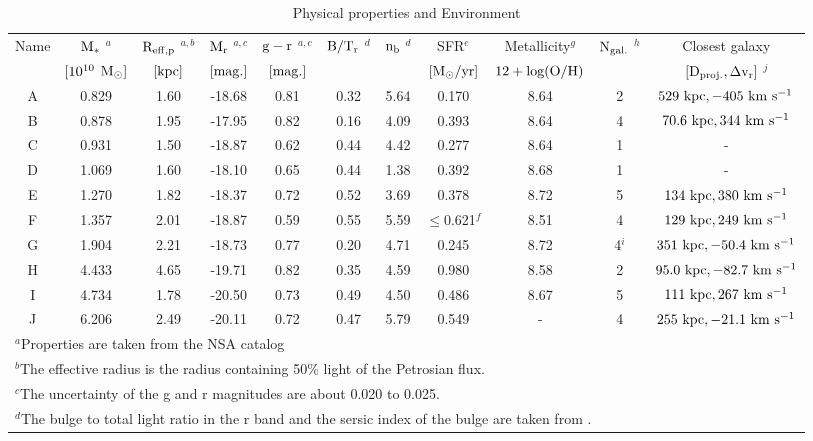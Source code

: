 \documentclass[fleqn,usenatbib]{mnras}
\begin{document}
\begin{table}
\centering
\caption{Physical properties and Environment}
\label{tab:photometric}
\begin{tabular}{ccccccccccc}

\hline
Name & $\rm M_{*}$ $^{a}$ & $\rm R_{eff,p}$ $^{a,b}$ &
$\rm M_{r}$ $^{a,c}$ & $\rm g-r$ $^{a,c}$ & $\rm B/T_{r}$ $^{d}$ & $\rm n_{b}$ $^{d}$ & 
SFR$^{e}$ & Metallicity$^{g}$ & 
$\rm N_{gal.}$ $^{h}$ & Closest galaxy\\
 & $\rm [10^{10}$ $\rm M_{\odot}]$ & $\rm [kpc]$ & 
$\rm [mag.]$ & $\rm [mag.]$ &  & &
$\rm [M_{\odot}/yr]$& $\rm 12+log(O/H)$& 
& $\rm [D_{proj.},\Delta v_{r}]$ $^{j}$ \\
\hline
A & 0.829 & 1.60 & -18.68 & 0.81  & 0.32 & 5.64 &0.170 &     8.64&     2 & $\rm 529~kpc, -405~km~s^{-1}$ \\
B & 0.878 & 1.95 & -17.95 & 0.82  & 0.16 & 4.09 &0.393 &     8.64&     4 & $\rm 70.6~kpc, 344~km~s^{-1}$ \\
C & 0.931 & 1.50 & -18.87 & 0.62  & 0.44 & 4.42 &0.277 &     8.64&     1 & - \\
D & 1.069 & 1.60 & -18.10 & 0.65  & 0.44 & 1.38 &0.392 &     8.68&     1 & - \\
E & 1.270 & 1.82 & -18.37 & 0.72  & 0.52 & 3.69 &0.378 &     8.72&     5 & $\rm 134~kpc, 380~km~s^{-1}$ \\
F & 1.357 & 2.01 & -18.87 & 0.59  & 0.55 & 5.59 &$\leq$0.621$^{f}$ &     8.51& 4 & $\rm 129~kpc, 249~km~s^{-1}$ \\
G & 1.904 & 2.21 & -18.73 & 0.77  & 0.20 & 4.71 &0.245 &     8.72&     4$^{i}$ & $\rm 351~kpc, -50.4~km~s^{-1}$ \\
H & 4.433 & 4.65 & -19.71 & 0.82  & 0.35 & 4.59 &0.980 &     8.58&     2 & $\rm 95.0~kpc, -82.7~km~s^{-1}$ \\
I & 4.734 & 1.78 & -20.50 & 0.73  & 0.49 & 4.50 &0.486 &     8.67&     5 & $\rm 111~kpc, 267~km~s^{-1}$   \\
J & 6.206 & 2.49 & -20.11 & 0.72  & 0.47 & 5.79 &0.549 &     -&     4 & $\rm 255~kpc, -21.1~km~s^{-1}$   \\
\hline
\multicolumn{11}{l}{$^{a}$Properties are taken from the NSA catalog \citep{NSA} }\\
\multicolumn{11}{l}{$^{b}$The effective radius is the radius containing 50\% light of the Petrosian flux.}\\
\multicolumn{11}{l}{$^{c}$The uncertainty of the g and r magnitudes are about 0.020 to 0.025.}\\
\multicolumn{11}{l}{$^{d}$The bulge to total light ratio in the r band and the sersic index of the bulge are taken from \citet{Simard2011}.}\\

\end{tabular}
\end{table}
\end{document}
